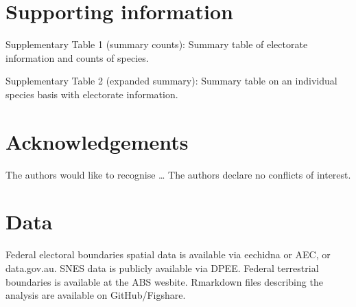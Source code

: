 \documentclass[a4paper,11pt]{article}
\begin{document}
\newpage
\section{Supporting information}

Supplementary Table 1 (summary counts): Summary table of electorate information and counts of species.

Supplementary Table 2 (expanded summary): Summary table on an individual species basis with electorate information.

\newpage
\section{Acknowledgements}
The authors would like to recognise \ldots
The authors declare no conflicts of interest.

\newpage
\section{Data}
Federal electoral boundaries spatial data is available via eechidna or AEC, or data.gov.au.
SNES data is publicly available via DPEE.
Federal terrestrial boundaries is available at the ABS wesbite.
Rmarkdown files describing the analysis are available on GitHub/Figshare.
\end{document}
